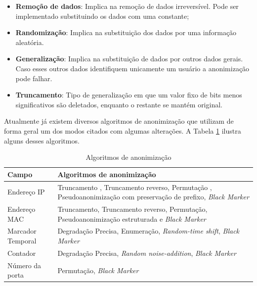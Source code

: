   \begin{itemize}
      \item \textbf{Remoção de dados}: Implica na remoção de dados irreversível. Pode ser implementado substituindo os dados com uma constante;
      \item \textbf{Randomização}: Implica na substituição dos dados por uma informação aleatória.
      \item \textbf{Generalização}: Implica na substituição de dados por outros dados gerais. Caso esses outros dados identifiquem unicamente um usuário a anonimização pode falhar.
     \item \textbf{Truncamento}: Tipo de generalização em que um valor fixo de bits menos significativos  são deletados, enquanto o restante se mantém original.
  \end{itemize} 
  
  Atualmente já existem diversos algoritmos de anonimização que utilizam de forma geral um dos modos citados com algumas alterações. A Tabela \ref{tab1} ilustra alguns desses algoritmos.
  
 \begin{table}[h]
 \centering
 \caption{Algoritmos de anonimização}
\begin{tabular}{l | p{12cm}}

\hline 
\hline
\textbf{Campo} & \textbf{Algoritmos de anonimização} \\ \hline \hline
Endereço IP & Truncamento , Truncamento reverso, Permutação , Pseudoanonimização com preservação de prefixo, \emph{Black Marker} \\ \hline 
Endereço MAC &  Truncamento, Truncamento reverso, Permutação, Pseudoanonimização estruturada e \emph{Black Marker}\\ \hline
 Marcador Temporal & Degradação Precisa, Enumeração, \emph{Random-time shift}, \emph{Black Marker} \\ \hline
 Contador & Degradação Precisa, \emph{Random noise-addition}, \emph{Black Marker} \\ \hline
 Número da porta &  Permutação, \emph{Black Marker} \\ \hline

\end{tabular}
\label{tab1}
\end{table}

